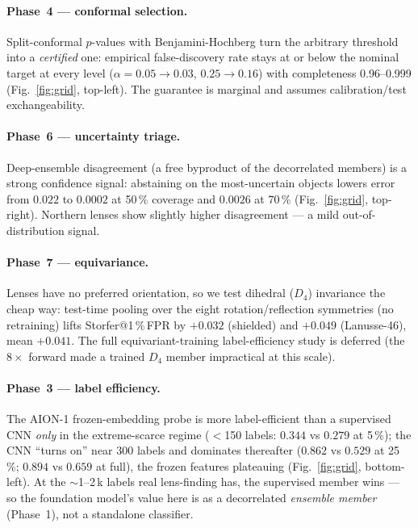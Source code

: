 \documentclass[11pt,letterpaper]{article}
\makeatletter
\newcommand{\aion}{\textsc{AION-1}}
\newcommand{\fpr}[1]{@#1\,\%\,FPR}
\makeatother
\begin{document}
\paragraph{Phase~4 --- conformal selection.} Split-conformal $p$-values with
Benjamini-Hochberg \citep{jin2023conformal} turn the arbitrary threshold into a
\emph{certified} one: empirical false-discovery rate stays at or below the nominal
target at every level ($\alpha{=}0.05\!\to\!0.03$, $0.25\!\to\!0.16$) with
completeness 0.96--0.999 (Fig.~\ref{fig:grid}, top-left). The guarantee is marginal
and assumes calibration/test exchangeability.

\paragraph{Phase~6 --- uncertainty triage.} Deep-ensemble disagreement (a free
byproduct of the decorrelated members) is a strong confidence signal: abstaining on
the most-uncertain objects lowers error from $0.022$ to $0.0002$ at 50\,\% coverage
and $0.0026$ at 70\,\% (Fig.~\ref{fig:grid}, top-right). Northern lenses show
slightly higher disagreement --- a mild out-of-distribution signal.

\paragraph{Phase~7 --- equivariance.} Lenses have no preferred orientation, so we
test dihedral ($D_4$) invariance the cheap way: test-time pooling over the eight
rotation/reflection symmetries (no retraining) lifts Storfer\fpr{1} by $+0.032$
(shielded) and $+0.049$ (Lanusse-46), mean $+0.041$. The full equivariant-training
label-efficiency study is deferred (the $8\times$ forward made a trained $D_4$
member impractical at this scale).

\paragraph{Phase~3 --- label efficiency.} The \aion{} frozen-embedding probe is
more label-efficient than a supervised CNN \emph{only} in the extreme-scarce regime
($<$150 labels: $0.344$ vs $0.279$ at 5\,\%); the CNN ``turns on'' near 300 labels
and dominates thereafter ($0.862$ vs $0.529$ at 25\,\%; $0.894$ vs $0.659$ at full),
the frozen features plateauing (Fig.~\ref{fig:grid}, bottom-left). At the
$\sim$1--2\,k labels real lens-finding has, the supervised member wins --- so the
foundation model's value here is as a decorrelated \emph{ensemble member}
(Phase~1), not a standalone classifier.
\end{document}
